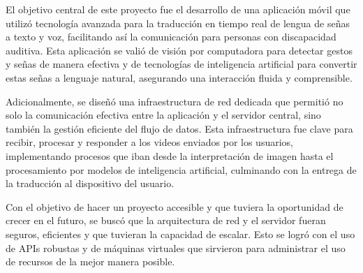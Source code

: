 El objetivo central de este proyecto fue el desarrollo de una aplicación móvil que utilizó tecnología avanzada para la traducción en tiempo real de lengua de señas a texto y voz, facilitando así la comunicación para personas con discapacidad auditiva. Esta aplicación se valió de visión por computadora para detectar gestos y señas de manera efectiva y de tecnologías de inteligencia artificial para convertir estas señas a lenguaje natural, asegurando una interacción fluida y comprensible.

Adicionalmente, se diseñó una infraestructura de red dedicada que permitió no solo la comunicación efectiva entre la aplicación y el servidor central, sino también la gestión eficiente del flujo de datos. Esta infraestructura fue clave para recibir, procesar y responder a los videos enviados por los usuarios, implementando procesos que iban desde la interpretación de imagen hasta el procesamiento por modelos de inteligencia artificial, culminando con la entrega de la traducción al dispositivo del usuario.

Con el objetivo de hacer un proyecto accesible y que tuviera la oportunidad de crecer en el futuro, se buscó que la arquitectura de red y el servidor fueran seguros, eficientes y que tuvieran la capacidad de escalar. Esto se logró con el uso de APIs robustas y de máquinas virtuales que sirvieron para administrar el uso de recursos de la mejor manera posible.